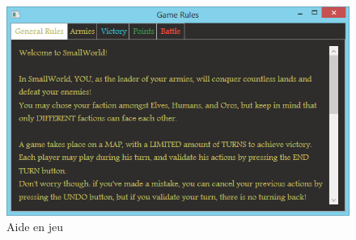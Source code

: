 \documentclass[a4paper]{article}
\begin{document}
\begin{figure}[h]
\begin{center}
\includegraphics[scale=0.52]{./img/help.png}
\caption{Aide en jeu}
\end{center}
\end{figure}
\end{document}
